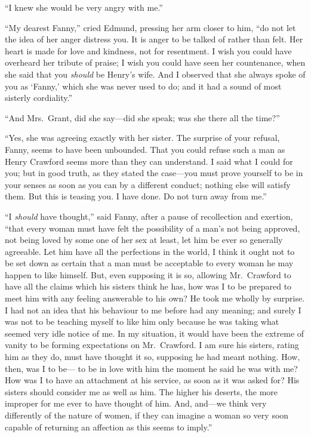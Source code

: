 \documentclass{article}
\begin{document}
``I knew she would be very angry with me.''

``My dearest Fanny,'' cried Edmund, pressing her arm closer
to him, ``do not let the idea of her anger distress you.
It is anger to be talked of rather than felt.  Her heart
is made for love and kindness, not for resentment.
I wish you could have overheard her tribute of praise;
I wish you could have seen her countenance, when she said
that you \emph{should} be Henry's wife.  And I observed that she
always spoke of you as `Fanny,' which she was never used to do;
and it had a sound of most sisterly cordiality.''

``And Mrs.\ Grant, did she say---did she speak; was she
there all the time?''

``Yes, she was agreeing exactly with her sister.  The surprise
of your refusal, Fanny, seems to have been unbounded.
That you could refuse such a man as Henry Crawford seems
more than they can understand.  I said what I could for you;
but in good truth, as they stated the case---you must
prove yourself to be in your senses as soon as you can
by a different conduct; nothing else will satisfy them.
But this is teasing you.  I have done.  Do not turn away
from me.''

``I \emph{should} have thought,'' said Fanny, after a pause
of recollection and exertion, ``that every woman must
have felt the possibility of a man's not being approved,
not being loved by some one of her sex at least, let him
be ever so generally agreeable.  Let him have all the
perfections in the world, I think it ought not to be set
down as certain that a man must be acceptable to every
woman he may happen to like himself.  But, even supposing
it is so, allowing Mr.\ Crawford to have all the claims
which his sisters think he has, how was I to be prepared
to meet him with any feeling answerable to his own?
He took me wholly by surprise.  I had not an idea that
his behaviour to me before had any meaning; and surely I
was not to be teaching myself to like him only because
he was taking what seemed very idle notice of me.
In my situation, it would have been the extreme of vanity
to be forming expectations on Mr.\ Crawford.  I am sure
his sisters, rating him as they do, must have thought it so,
supposing he had meant nothing.  How, then, was I to be---%
to be in love with him the moment he said he was with me?
How was I to have an attachment at his service, as soon
as it was asked for?  His sisters should consider me
as well as him.  The higher his deserts, the more improper
for me ever to have thought of him.  And, and---we think
very differently of the nature of women, if they can imagine
a woman so very soon capable of returning an affection
as this seems to imply.''
\end{document}
